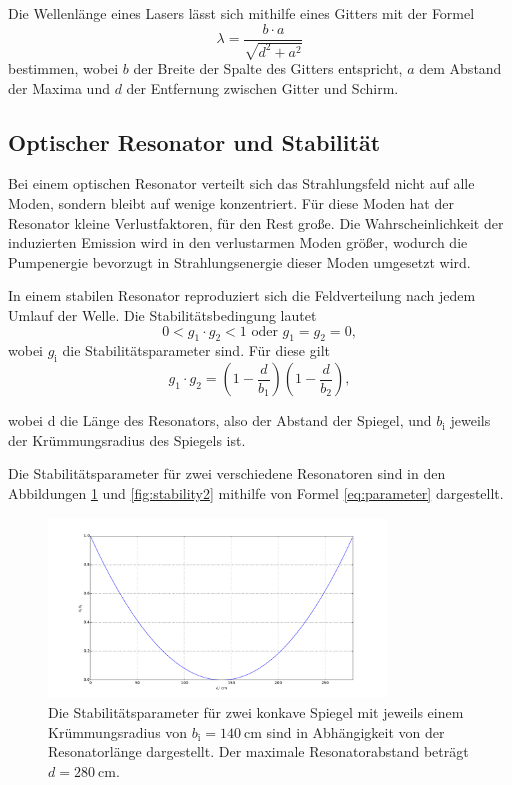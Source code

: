 Die Wellenlänge eines Lasers lässt sich mithilfe eines Gitters mit der Formel 
\begin{equation}
    \lambda = \frac{b \cdot a}{\sqrt{d^2 + a^2}}
    \label{eq:welle}
\end{equation}
bestimmen, wobei $b$ der Breite der Spalte des Gitters entspricht, $a$ dem Abstand der Maxima und $d$ der Entfernung zwischen Gitter und Schirm.

\subsection{Optischer Resonator und Stabilität}
Bei einem optischen Resonator verteilt sich das Strahlungsfeld nicht auf alle Moden, sondern bleibt auf wenige konzentriert. Für diese Moden hat der Resonator kleine Verlustfaktoren, für den Rest große. Die Wahrscheinlichkeit der induzierten Emission wird in den verlustarmen Moden größer, wodurch die Pumpenergie bevorzugt in Strahlungsenergie dieser Moden umgesetzt wird.

In einem stabilen Resonator reproduziert sich die Feldverteilung nach jedem Umlauf der Welle.
Die Stabilitätsbedingung lautet
\begin{equation}
    0 < g_1 \cdot g_2 < 1 \text{ oder } g_1 = g_2 = 0,
    \label{eq:stabilitaet}
\end{equation}
wobei $g_\text{i}$ die Stabilitätsparameter sind.
Für diese gilt
\begin{equation}
    g_1 \cdot g_2 = \left(1-\frac{d}{b_1} \right)\left(1-\frac{d}{b_2} \right),
    \label{eq:parameter}
\end{equation}

wobei d die Länge des Resonators, also der Abstand der Spiegel, und $b_\text{i}$ jeweils der Krümmungsradius des Spiegels ist.

Die Stabilitätsparameter für zwei verschiedene Resonatoren sind in den Abbildungen \ref{fig:stability1} und \ref{fig:stability2} mithilfe von Formel \ref{eq:parameter} dargestellt.

\begin{figure}
    \centering
    \includegraphics[width=0.8\textwidth]{plots/stability1.pdf}
    \caption{Die Stabilitätsparameter für zwei konkave Spiegel mit jeweils einem Krümmungsradius von $b_\text{i} = \SI{140}{\centi\meter}$ sind in Abhängigkeit von der Resonatorlänge dargestellt. Der maximale Resonatorabstand beträgt $d = \SI{280}{\centi\meter}$.}
    \label{fig:stability1}
\end{figure}

